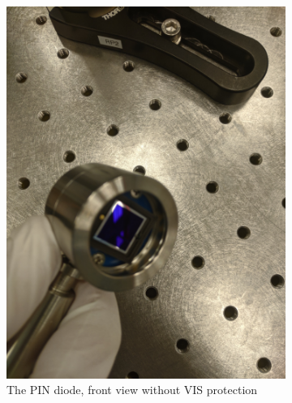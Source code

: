 \documentclass[a4paper, 10pt]{article}
\begin{document}
\begin{figure}[h]
    \centering
    \begin{subfigure}{0.4\textwidth}
        \includegraphics[width=\textwidth]{./images/pin-front.jpg}
        \caption{The PIN diode, front view without VIS protection}
        \label{fig:pin-diode}
    \end{subfigure}
    \begin{subfigure}{0.4\textwidth}

\end{subfigure}
\end{figure}
\end{document}
